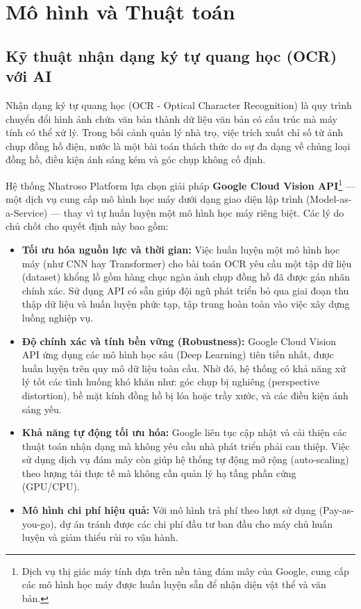 \section{Mô hình và Thuật toán}

\subsection{Kỹ thuật nhận dạng ký tự quang học (OCR) với AI}
Nhận dạng ký tự quang học (OCR - Optical Character Recognition) là quy trình chuyển đổi hình ảnh chứa văn bản thành dữ liệu văn bản có cấu trúc mà máy tính có thể xử lý. Trong bối cảnh quản lý nhà trọ, việc trích xuất chỉ số từ ảnh chụp đồng hồ điện, nước là một bài toán thách thức do sự đa dạng về chủng loại đồng hồ, điều kiện ánh sáng kém và góc chụp không cố định.

Hệ thống Nhatroso Platform lựa chọn giải pháp \textbf{Google Cloud Vision API}\footnote{Dịch vụ thị giác máy tính dựa trên nền tảng đám mây của Google, cung cấp các mô hình học máy được huấn luyện sẵn để nhận diện vật thể và văn bản.} \cite{GoogleCloudVision} — một dịch vụ cung cấp mô hình học máy dưới dạng giao diện lập trình (Model-as-a-Service) — thay vì tự huấn luyện một mô hình học máy riêng biệt. Các lý do chủ chốt cho quyết định này bao gồm:

\begin{itemize}
    \item \textbf{Tối ưu hóa nguồn lực và thời gian:} Việc huấn luyện một mô hình học máy (như CNN hay Transformer) cho bài toán OCR yêu cầu một tập dữ liệu (dataset) khổng lồ gồm hàng chục ngàn ảnh chụp đồng hồ đã được gán nhãn chính xác. Sử dụng API có sẵn giúp đội ngũ phát triển bỏ qua giai đoạn thu thập dữ liệu và huấn luyện phức tạp, tập trung hoàn toàn vào việc xây dựng luồng nghiệp vụ.
    \item \textbf{Độ chính xác và tính bền vững (Robustness):} Google Cloud Vision API ứng dụng các mô hình học sâu (Deep Learning) tiên tiến nhất, được huấn luyện trên quy mô dữ liệu toàn cầu. Nhờ đó, hệ thống có khả năng xử lý tốt các tình huống khó khăn như: góc chụp bị nghiêng (perspective distortion), bề mặt kính đồng hồ bị lóa hoặc trầy xước, và các điều kiện ánh sáng yếu.
    \item \textbf{Khả năng tự động tối ưu hóa:} Google liên tục cập nhật và cải thiện các thuật toán nhận dạng mà không yêu cầu nhà phát triển phải can thiệp. Việc sử dụng dịch vụ đám mây còn giúp hệ thống tự động mở rộng (auto-scaling) theo lượng tải thực tế mà không cần quản lý hạ tầng phần cứng (GPU/CPU).
    \item \textbf{Mô hình chi phí hiệu quả:} Với mô hình trả phí theo lượt sử dụng (Pay-as-you-go), dự án tránh được các chi phí đầu tư ban đầu cho máy chủ huấn luyện và giảm thiểu rủi ro vận hành.
\end{itemize}

